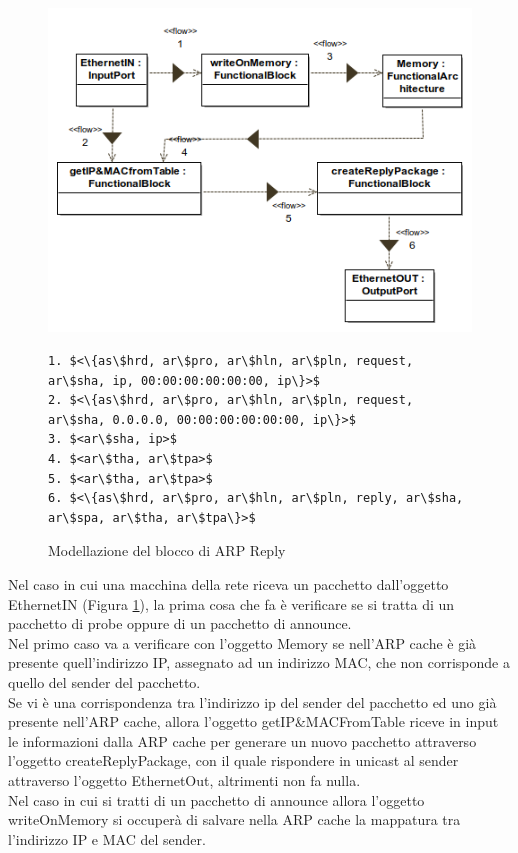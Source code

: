 \begin{figure}[h!] 
    \centering 
    \includegraphics[scale=0.5]{../img/ARP/ARP_Reply_Object_diagram.png} 
\begin{lstlisting}[frame=single, mathescape, basicstyle=\footnotesize]
1. $<\{as\$hrd, ar\$pro, ar\$hln, ar\$pln, request, ar\$sha, ip, 00:00:00:00:00:00, ip\}>$
2. $<\{as\$hrd, ar\$pro, ar\$hln, ar\$pln, request, ar\$sha, 0.0.0.0, 00:00:00:00:00:00, ip\}>$
3. $<ar\$sha, ip>$
4. $<ar\$tha, ar\$tpa>$
5. $<ar\$tha, ar\$tpa>$
6. $<\{as\$hrd, ar\$pro, ar\$hln, ar\$pln, reply, ar\$sha, ar\$spa, ar\$tha, ar\$tpa\}>$
\end{lstlisting}
    \caption{Modellazione del blocco di ARP Reply} 
    \label{fig:ARP2}
\end{figure}
\noindent Nel caso in cui una macchina della rete riceva un pacchetto dall'oggetto EthernetIN (Figura \ref{fig:ARP2}), la prima cosa che fa è verificare se si tratta di un pacchetto di probe oppure di un pacchetto di announce.\\
Nel primo caso va a verificare con l'oggetto Memory se nell'ARP cache è già presente quell'indirizzo IP, assegnato ad un indirizzo MAC, che non corrisponde a quello del sender del pacchetto.\\ 
Se vi è una corrispondenza tra l'indirizzo ip del sender del pacchetto ed uno già presente nell'ARP cache, allora l'oggetto getIP\&MACFromTable riceve in input le informazioni dalla ARP cache per generare un nuovo pacchetto attraverso l'oggetto createReplyPackage, con il quale rispondere in unicast al sender attraverso l'oggetto EthernetOut, altrimenti non fa nulla.\\
Nel caso in cui si tratti di un pacchetto di announce allora l'oggetto writeOnMemory si occuperà di salvare nella ARP cache la mappatura tra l'indirizzo IP e MAC del sender.\\

